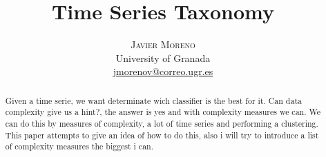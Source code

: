 \documentclass[twoside, english]{article}
\title{\vspace{-15mm}\fontsize{24pt}{10pt}\selectfont\textbf{Time Series Taxonomy}} %
\author{
\large
\textsc{Javier Moreno}\\[2mm] %
\normalsize University of Granada \\ %
\normalsize \href{mailto:jmorenov@correo.ugr.es}{jmorenov@correo.ugr.es} %
\vspace{-5mm}
}
\date{}
\begin{document}
\maketitle %

\thispagestyle{fancy} %


\begin{abstract}

\noindent Given a time serie, we want determinate wich classifier is the best for it. Can data complexity give us a hint?, the answer is yes and with complexity measures we can. We can do this by measures of complexity, a lot of time series and performing a clustering. This paper attempts to give an idea of how to do this, also i will try to introduce a list of complexity measures the biggest i can.

\end{abstract}

\end{document}

